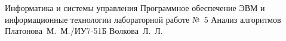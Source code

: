 
\makereporttitle
    {Информатика и системы управления}
    {Программное обеспечение ЭВМ и информационные технологии}
    {лабораторной работе №~5}
    {Анализ алгоритмов}
    {}
    {}
    {Платонова~М.~М./ИУ7-51Б}
    {Волкова~Л.~Л.}
